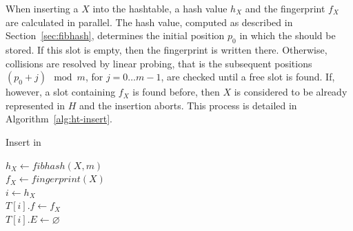 When inserting a \kmer $X$ into the hashtable, a hash value $h_X$ and the fingerprint $f_X$ are calculated in parallel. The hash value, computed as described in Section~\ref{sec:fibhash}, determines the initial position $p_0$ in which the \kmer should be stored. If this slot is empty, then the fingerprint is written there. Otherwise, collisions are resolved by linear probing, that is the subsequent positions $(p_0+j)\mod m$, for $j=0\ldots m-1$, are checked until a free slot is found. If, however, a slot containing $f_X$ is found before, then $X$ is considered to be already represented in $H$ and the insertion aborts. This process is detailed in Algorithm~\ref{alg:ht-insert}. 





\begin{algorithm}
	\caption{Insert \kmer in \dBHT}\label{alg:ht-insert}
	$h_X \gets fibhash(X, m)$\\
	$f_X \gets fingerprint(X)$\\
	$i \gets h_X$\\
	$T[i].f\gets f_X$\\
	$T[i].E\gets \varnothing$\\
\end{algorithm}

